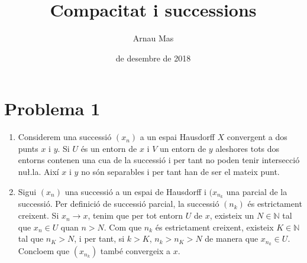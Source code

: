 \documentclass[12pt]{article}
\title{\sffamily {\bfseries Seminari 3:} Compacitat i successions}
\author{\sffamily Arnau Mas}
\date{\sffamily 11 de desembre de 2018}
\numberwithin{table}{section}
\numberwithin{figure}{section}
\numberwithin{equation}{section}
\newcommand{\N}{\mathbb{N}}
\begin{document}
\maketitle

\section*{Problema 1}
\begin{enumerate}[label=(\alph*), font=\bfseries \sffamily, wide, labelwidth=!, labelindent=0pt]
	\item Considerem una successió \( (x_n) \) a un espai Hausdorff \( X \) convergent a dos punts \( x \) i \( y \). Si \( U \) és un entorn de \( x \) i \( V \) un entorn de \( y \) aleshores tots dos entorns contenen una cua de la successió i per tant no poden tenir intersecció nu\l.la. Així \( x \) i \( y \) no són separables i per tant han de ser el mateix punt.   

	\item Sigui \( (x_n) \) una successió a un espai de Hausdorff i \( (x_{n_k} \) una parcial de la successió. Per definició de successió parcial, la successió \( (n_k) \) és estrictament creixent. Si \( x_n \to x \), tenim que per tot entorn \( U \) de \( x \), existeix un \( N \in \N \) tal que \( x_n \in U \) quan \( n > N \). Com que \( n_k \) és estrictament creixent, existeix \( K \in \N \) tal que \( n_K > N \), i per tant, si \( k > K \), \( n_k > n_K > N \) de manera que \( x_{n_k} \in U \). Concloem que \( (x_{n_k}) \) també convergeix a \( x \).
\end{enumerate}
\end{document}
